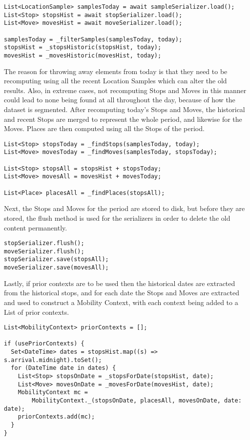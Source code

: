 \begin{verbatim}
List<LocationSample> samplesToday = await sampleSerializer.load();
List<Stop> stopsHist = await stopSerializer.load();
List<Move> movesHist = await moveSerializer.load();

samplesToday = _filterSamples(samplesToday, today);
stopsHist = _stopsHistoric(stopsHist, today);
movesHist = _movesHistoric(movesHist, today);
\end{verbatim}

The reason for throwing away elements from today is that they need to be recomputing using all the recent Location Samples which can alter the old results. Also, in extreme cases, not recomputing Stops and Moves in this manner could lead to none being found at all throughout the day, because of how the dataset is segmented. After recomputing today's Stops and Moves, the historical and recent Stops are merged to represent the whole period, and likewise for the Moves. Places are then computed using all the Stops of the period.
\begin{verbatim}
List<Stop> stopsToday = _findStops(samplesToday, today);
List<Move> movesToday = _findMoves(samplesToday, stopsToday);

List<Stop> stopsAll = stopsHist + stopsToday;
List<Move> movesAll = movesHist + movesToday;

List<Place> placesAll = _findPlaces(stopsAll);
\end{verbatim}

Next, the Stops and Moves for the period are stored to disk, but before they are stored, the flush method is used for the serializers in order to delete the old content permanently.
\begin{verbatim}
stopSerializer.flush();
moveSerializer.flush();
stopSerializer.save(stopsAll);
moveSerializer.save(movesAll);
\end{verbatim}

Lastly, if prior contexts are to be used then the historical dates are extracted from the historical stops, and for each date the Stops and Moves are extracted and used to construct a Mobility Context, with each context being added to a List of prior contexts.

\begin{verbatim}
List<MobilityContext> priorContexts = [];

if (usePriorContexts) {
  Set<DateTime> dates = stopsHist.map((s) => s.arrival.midnight).toSet();
  for (DateTime date in dates) {
    List<Stop> stopsOnDate = _stopsForDate(stopsHist, date);
    List<Move> movesOnDate = _movesForDate(movesHist, date);
    MobilityContext mc =
        MobilityContext._(stopsOnDate, placesAll, movesOnDate, date: date);
    priorContexts.add(mc);
  }
}
\end{verbatim}

